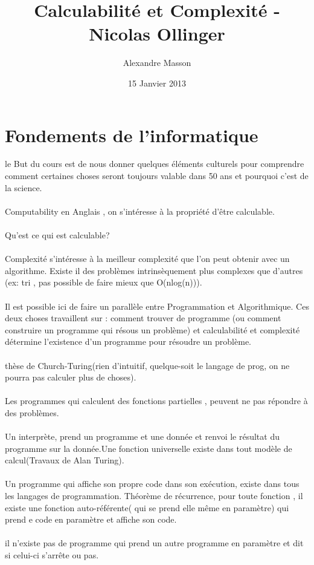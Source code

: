 \documentclass{report}
\title{Calculabilité et Complexité - Nicolas Ollinger}
\author{Alexandre Masson}
\date{15 Janvier 2013}
\begin{document}
\maketitle
\newpage
\tableofcontents
\newpage
\section{Fondements de l'informatique}le But du cours est de nous donner quelques éléments culturels pour comprendre comment certaines choses seront toujours valable dans 50 ans et pourquoi c'est de la science.\\\\Computability en Anglais , on s'intéresse à la propriété d’être calculable.\\\\Qu'est ce qui est calculable?\\\\ Complexité s’intéresse à la meilleur complexité que l'on peut obtenir avec un algorithme. Existe il des problèmes intrinsèquement plus complexes que d'autres (ex: tri , pas possible de faire mieux que O(nlog(n))).\\\\Il est possible ici de faire un parallèle entre Programmation et Algorithmique. Ces deux choses travaillent sur : comment trouver de programme (ou comment construire un programme qui résous un problème) et calculabilité et complexité détermine l'existence d'un programme pour résoudre un problème.\\\\thèse de Church-Turing(rien d'intuitif, quelque-soit le langage de prog, on ne pourra pas calculer plus de choses).\\\\Les programmes qui calculent des fonctions partielles , peuvent ne pas répondre à des problèmes.\\\\Un interprète, prend un programme et une donnée et renvoi le résultat du programme sur la donnée.Une fonction universelle existe dans tout modèle de calcul(Travaux de Alan Turing).\\\\Un programme qui affiche son propre code dans son exécution, existe dans tous les langages de programmation. Théorème de récurrence, pour toute fonction , il existe une fonction auto-référente( qui se prend elle même en paramètre) qui prend e code en paramètre et affiche son code. \\\\ il n'existe pas de programme qui prend un autre programme en paramètre et dit si celui-ci s’arrête  ou pas.\newpage
\end{document}
